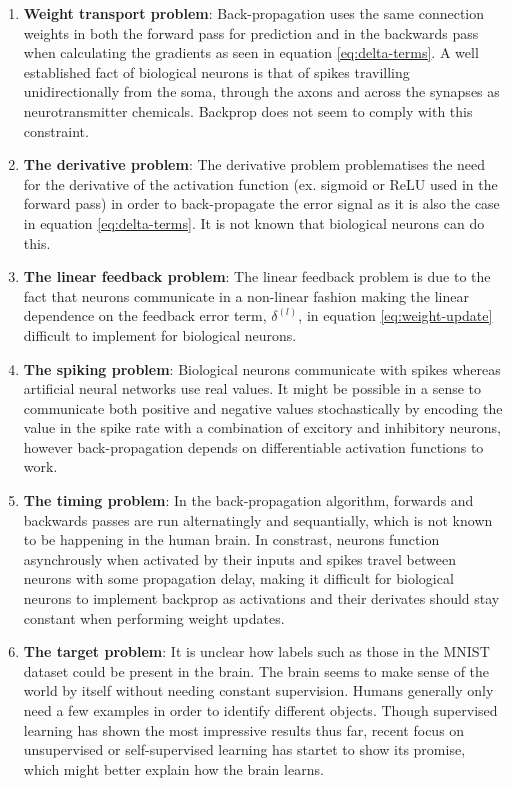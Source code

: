 \documentclass[a4paper,11pt]{article} %
\begin{document}
\begin{enumerate}
  \item \textbf{Weight transport problem}: Back-propagation uses the same connection weights in both the forward pass for prediction and in the backwards pass when calculating the gradients as seen in equation \ref{eq:delta-terms}. A well established fact of biological neurons is that of spikes travilling unidirectionally from the soma, through the axons and across the synapses as neurotransmitter chemicals. Backprop does not seem to comply with this constraint. %
  \item \textbf{The derivative problem}: The derivative problem problematises the need for the derivative of the activation function (ex. sigmoid or ReLU used in the forward pass) in order to back-propagate the error signal as it is also the case in equation \ref{eq:delta-terms}. It is not known that biological neurons can do this.
  \item \textbf{The linear feedback problem}: The linear feedback problem is due to the fact that neurons communicate in a non-linear fashion making the linear dependence on the feedback error term, $\delta^{(l)}$, in equation \ref{eq:weight-update} difficult to implement for biological neurons. 
  \item \textbf{The spiking problem}: Biological neurons communicate with spikes whereas artificial neural networks use real values. It might be possible in a sense to communicate both positive and negative values stochastically by encoding the value in the spike rate with a combination of excitory and inhibitory neurons, however back-propagation depends on differentiable activation functions to work. %
  \item \textbf{The timing problem}: In the back-propagation algorithm, forwards and backwards passes are run alternatingly and sequantially, which is not known to be happening in the human brain. In constrast, neurons function asynchrously when activated by their inputs and spikes travel between neurons with some propagation delay, making it difficult for biological neurons to implement backprop as activations and their derivates should stay constant when performing weight updates. 
  \item \textbf{The target problem}: It is unclear how labels such as those in the MNIST dataset could be present in the brain. The brain seems to make sense of the world by itself without needing constant supervision. Humans generally only need a few examples in order to identify different objects. Though supervised learning has shown the most impressive results thus far, recent focus on unsupervised or self-supervised learning has startet to show its promise, which might better explain how the brain learns. 
\end{enumerate}
\end{document}
